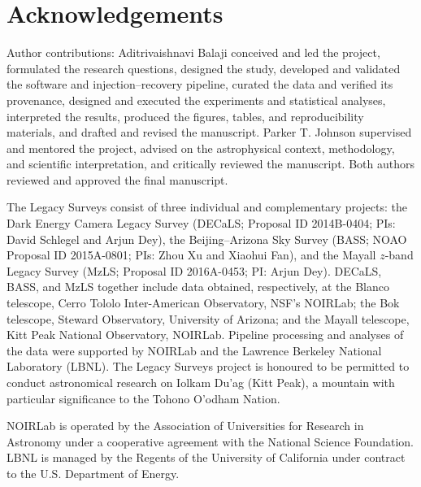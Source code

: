 \section*{Acknowledgements}

Author contributions: Aditrivaishnavi Balaji conceived and led the project,
formulated the research questions, designed the study, developed and validated
the software and injection--recovery pipeline, curated the data and verified
its provenance, designed and executed the experiments and statistical
analyses, interpreted the results, produced the figures, tables, and
reproducibility materials, and drafted and revised the manuscript. Parker
T. Johnson supervised and mentored the project, advised on the astrophysical
context, methodology, and scientific interpretation, and critically reviewed
the manuscript. Both authors reviewed and approved the final manuscript.

The Legacy Surveys consist of three individual and complementary projects:
the Dark Energy Camera Legacy Survey (DECaLS; Proposal ID 2014B-0404; PIs:
David Schlegel and Arjun Dey), the Beijing--Arizona Sky Survey (BASS; NOAO
Proposal ID 2015A-0801; PIs: Zhou Xu and Xiaohui Fan), and the Mayall
\(z\)-band Legacy Survey (MzLS; Proposal ID 2016A-0453; PI: Arjun Dey).
DECaLS, BASS, and MzLS together include data obtained, respectively, at the
Blanco telescope, Cerro Tololo Inter-American Observatory, NSF's NOIRLab; the
Bok telescope, Steward Observatory, University of Arizona; and the Mayall
telescope, Kitt Peak National Observatory, NOIRLab. Pipeline processing and
analyses of the data were supported by NOIRLab and the Lawrence Berkeley
National Laboratory (LBNL). The Legacy Surveys project is honoured to be
permitted to conduct astronomical research on Iolkam Du'ag (Kitt Peak), a
mountain with particular significance to the Tohono O'odham Nation.

NOIRLab is operated by the Association of Universities for Research in
Astronomy under a cooperative agreement with the National Science Foundation.
LBNL is managed by the Regents of the University of California under contract
to the U.S. Department of Energy.

